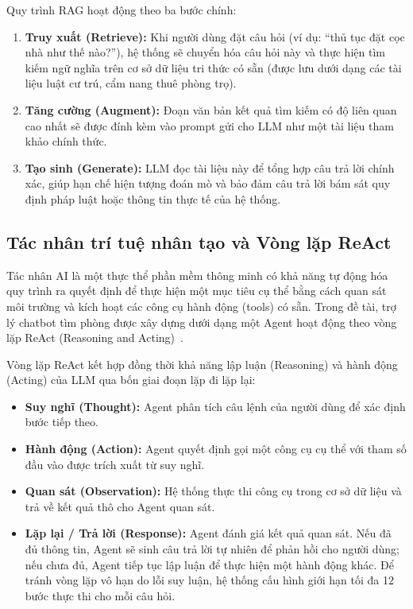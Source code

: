 Quy trình RAG hoạt động theo ba bước chính:
\begin{enumerate}
    \item \textbf{Truy xuất (Retrieve):} Khi người dùng đặt câu hỏi (ví dụ: ``thủ tục đặt cọc nhà như thế nào?''), hệ thống sẽ chuyển hóa câu hỏi này và thực hiện tìm kiếm ngữ nghĩa trên cơ sở dữ liệu tri thức có sẵn (được lưu dưới dạng các tài liệu luật cư trú, cẩm nang thuê phòng trọ).
    \item \textbf{Tăng cường (Augment):} Đoạn văn bản kết quả tìm kiếm có độ liên quan cao nhất sẽ được đính kèm vào prompt gửi cho LLM như một tài liệu tham khảo chính thức.
    \item \textbf{Tạo sinh (Generate):} LLM đọc tài liệu này để tổng hợp câu trả lời chính xác, giúp hạn chế hiện tượng đoán mò và bảo đảm câu trả lời bám sát quy định pháp luật hoặc thông tin thực tế của hệ thống.
\end{enumerate}

\FloatBarrier
\subsection{Tác nhân trí tuệ nhân tạo và Vòng lặp ReAct}

Tác nhân AI là một thực thể phần mềm thông minh có khả năng tự động hóa quy trình ra quyết định để thực hiện một mục tiêu cụ thể bằng cách quan sát môi trường và kích hoạt các công cụ hành động (tools) có sẵn. Trong đề tài, trợ lý chatbot tìm phòng được xây dựng dưới dạng một Agent hoạt động theo vòng lặp ReAct (Reasoning and Acting)~\cite{Yao2023ReAct}.

Vòng lặp ReAct kết hợp đồng thời khả năng lập luận (Reasoning) và hành động (Acting) của LLM qua bốn giai đoạn lặp đi lặp lại:
\begin{itemize}
    \item \textbf{Suy nghĩ (Thought):} Agent phân tích câu lệnh của người dùng để xác định bước tiếp theo.
    \item \textbf{Hành động (Action):} Agent quyết định gọi một công cụ cụ thể với tham số đầu vào được trích xuất từ suy nghĩ.
    \item \textbf{Quan sát (Observation):} Hệ thống thực thi công cụ trong cơ sở dữ liệu và trả về kết quả thô cho Agent quan sát.
    \item \textbf{Lặp lại / Trả lời (Response):} Agent đánh giá kết quả quan sát. Nếu đã đủ thông tin, Agent sẽ sinh câu trả lời tự nhiên để phản hồi cho người dùng; nếu chưa đủ, Agent tiếp tục lập luận để thực hiện một hành động khác. Để tránh vòng lặp vô hạn do lỗi suy luận, hệ thống cấu hình giới hạn tối đa 12 bước thực thi cho mỗi câu hỏi.
\end{itemize}

